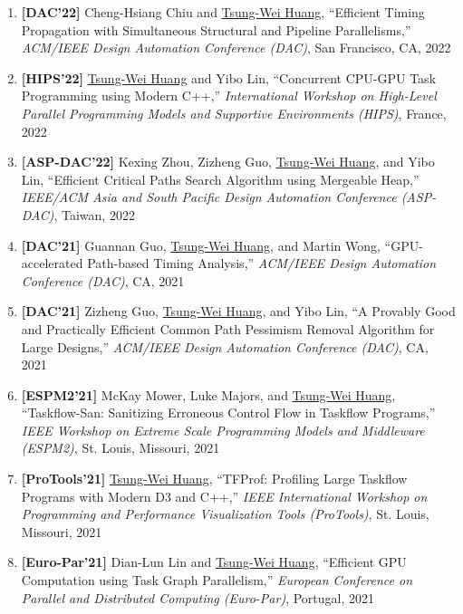 \documentclass[A4,11pt]{article}
\begin{document}
\begin{enumerate}
    \item \textbf{[DAC'22]} Cheng-Hsiang Chiu and \underline{Tsung-Wei Huang}, ``Efficient Timing Propagation with Simultaneous Structural and Pipeline Parallelisms,'' \textit{ACM/IEEE Design Automation Conference (DAC)}, San Francisco, CA, 2022 

    \item \textbf{[HIPS'22]} \underline{Tsung-Wei Huang} and Yibo Lin, ``Concurrent CPU-GPU Task Programming using Modern C++,'' \textit{International Workshop on High-Level Parallel Programming Models and Supportive Environments (HIPS)}, France, 2022

    \item \textbf{[ASP-DAC'22]} Kexing Zhou, Zizheng Guo, \underline{Tsung-Wei Huang}, and Yibo Lin, ``Efficient Critical Paths Search Algorithm using Mergeable Heap,'' \textit{IEEE/ACM Asia and South Pacific Design Automation Conference (ASP-DAC)}, Taiwan, 2022

    \item \textbf{[DAC'21]} Guannan Guo, \underline{Tsung-Wei Huang}, and Martin Wong, ``GPU-accelerated Path-based Timing Analysis,'' \textit{ACM/IEEE Design Automation Conference (DAC)}, CA, 2021

    \item \textbf{[DAC'21]} Zizheng Guo, \underline{Tsung-Wei Huang}, and Yibo Lin, ``A Provably Good and Practically Efficient Common Path Pessimism Removal Algorithm for Large Designs,'' \textit{ACM/IEEE Design Automation Conference (DAC)}, CA, 2021

    \item \textbf{[ESPM2'21]} McKay Mower, Luke Majors, and \underline{Tsung-Wei Huang}, ``Taskflow-San: Sanitizing Erroneous Control Flow in Taskflow Programs,'' \textit{IEEE Workshop on Extreme Scale Programming Models and Middleware (ESPM2)}, St. Louis, Missouri, 2021

    \item \textbf{[ProTools'21]} \underline{Tsung-Wei Huang}, ``TFProf: Profiling Large Taskflow Programs with Modern D3 and C++,'' \textit{IEEE International Workshop on Programming and Performance Visualization Tools (ProTools)}, St. Louis, Missouri, 2021

    \item \textbf{[Euro-Par'21]} Dian-Lun Lin and \underline{Tsung-Wei Huang}, ``Efficient GPU Computation using Task Graph Parallelism,'' \textit{European Conference on Parallel and Distributed Computing (Euro-Par)}, Portugal, 2021


\end{enumerate}
\end{document}
